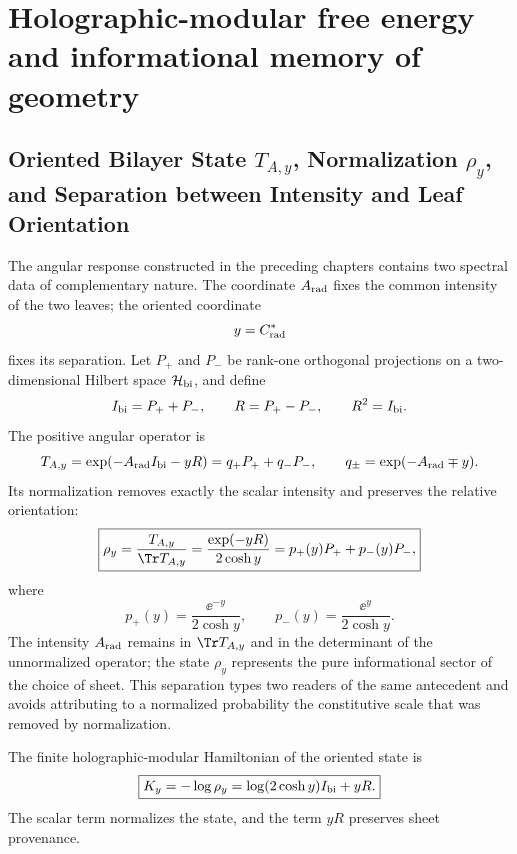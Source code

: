 \chapter{Holographic-modular free energy and informational memory of geometry}
\label{chap:energia-libre-holografica}

\section{Oriented Bilayer State \(T_{A,y}\), Normalization \(\rho_y\), and Separation between Intensity and Leaf Orientation}

The angular response constructed in the preceding chapters contains two
spectral data of complementary nature. The coordinate
\(A_{\rm rad}\) fixes the common intensity of the two leaves; the oriented
coordinate
\[
 y=C^{*}_{\rm rad}
\]
fixes its separation. Let \(P_+\) and \(P_-\) be rank-one orthogonal projections
on a two-dimensional Hilbert space \(\mathcal H_{\rm bi}\),
and define
\begin{equation}
 I_{\rm bi}=P_++P_-,
 \qquad
 R=P_+-P_-,
 \qquad
 R^2=I_{\rm bi}.
 \label{eq:rm-info-graduacion}
\end{equation}
The positive angular operator is
\begin{equation}
 T_{A,y}
 =\exp(-A_{\rm rad}I_{\rm bi}-yR)
 =q_+P_++q_-P_-,
 \qquad
 q_\pm=\exp(-A_{\rm rad}\mp y).
 \label{eq:rm-info-operador-angular}
\end{equation}
Its normalization removes exactly the scalar intensity and preserves the
relative orientation:
\begin{equation}
 \boxed{
 \rho_y
 =\frac{T_{A,y}}{\Tr T_{A,y}}
 =\frac{\exp(-yR)}{2\cosh y}
 =p_+(y)P_++p_-(y)P_- ,}
 \label{eq:rm-info-rho-y}
\end{equation}
where
\begin{equation}
 p_+(y)=\frac{\ee^{-y}}{2\cosh y},
 \qquad
 p_-(y)=\frac{\ee^{y}}{2\cosh y}.
 \label{eq:rm-info-probabilidades-hoja}
\end{equation}
The intensity \(A_{\rm rad}\) remains in \(\Tr T_{A,y}\) and in the
determinant of the unnormalized operator; the state \(\rho_y\) represents the
pure informational sector of the choice of sheet. This separation types two
readers of the same antecedent and avoids attributing to a normalized
probability the constitutive scale that was removed by normalization.

\begin{definition}
The finite holographic-modular Hamiltonian of the oriented state
is
\begin{equation}
 \boxed{
 K_y=-\log\rho_y
 =\log(2\cosh y)I_{\rm bi}+yR.}
 \label{eq:rm-info-hamiltoniano-bicapa}
\end{equation}
The scalar term normalizes the state, and the term \(yR\) preserves
sheet provenance.
\end{definition}

